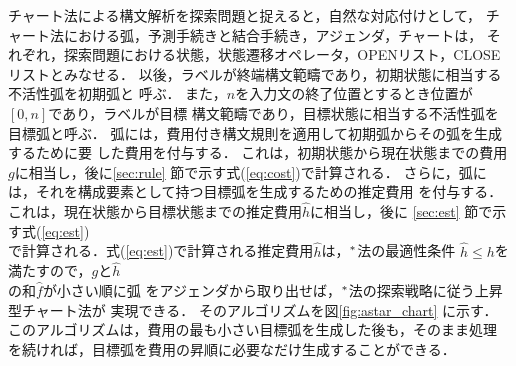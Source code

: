 チャート法による構文解析を探索問題と捉えると，自然な対応付けとして，
チャート法における弧，予測手続きと結合手続き，アジェンダ，チャートは，
それぞれ，探索問題における状態，状態遷移オペレータ，OPENリスト，CLOSE
リストとみなせる．
以後，ラベルが終端構文範疇であり，初期状態に相当する不活性弧を初期弧と
呼ぶ．
また，$n$を入力文の終了位置とするとき位置が$[0,n]$であり，ラベルが目標
構文範疇であり，目標状態に相当する不活性弧を目標弧と呼ぶ．
弧には，費用付き構文規則を適用して初期弧からその弧を生成するために要
した費用を付与する．
これは，初期状態から現在状態までの費用$g$に相当し，後に\ref{sec:rule}
節で示す式(\ref{eq:cost})で計算される．
さらに，弧には，それを構成要素として持つ目標弧を生成するための推定費用
を付与する．
これは，現在状態から目標状態までの推定費用$\hat{h}$に相当し，後に
\ref{sec:est} 節で示す式(\ref{eq:est})\\で計算される．\hspace*{-0.5mm}式(\ref{eq:est})\hspace*{-0.3mm}で計算される推定費用$\hat{h}$は，\hspace*{-0.5mm}$^*$法の最適性条件
$\hat{h} \le h$を満たすので，\hspace*{-0.5mm}$g$\hspace*{-0.1mm}と\hspace*{-0.1mm}$\hat{h}$\\の和$\hat{f}$が小さい順に弧
をアジェンダから取り出せば，$^*$法の探索戦略に従う上昇型チャート法が
実現できる．
そのアルゴリズムを図\ref{fig:astar_chart} に示す．
このアルゴリズムは，費用の最も小さい目標弧を生成した後も，そのまま処理
を続ければ，目標弧を費用の昇順に必要なだけ生成することができる．
